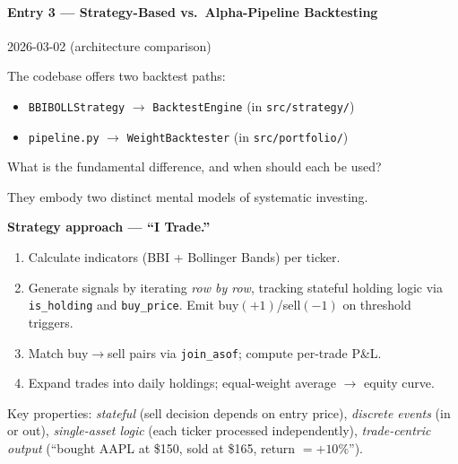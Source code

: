 \documentclass[a4paper, 11pt]{report}
\theoremstyle{definition}
\theoremstyle{remark}
\begin{document}
\paragraph{Entry 3 --- Strategy-Based vs.\ Alpha-Pipeline Backtesting}
\label{exp:strategy-vs-pipeline}
\begin{description}[style=nextline, leftmargin=1.8cm]
    \item[Date] 2026-03-02 \quad (architecture comparison)
    \item[Question]
        The codebase offers two backtest paths:
        \begin{itemize}[nosep,topsep=2pt]
            \item \texttt{BBIBOLLStrategy} $\to$
                  \texttt{BacktestEngine}
                  (in \texttt{src/strategy/})
            \item \texttt{pipeline.py} $\to$
                  \texttt{WeightBacktester}
                  (in \texttt{src/portfolio/})
        \end{itemize}
        What is the fundamental difference, and when should
        each be used?

    \item[Finding]
        They embody two distinct mental models of systematic investing.

        \medskip
        \textbf{Strategy approach --- ``I Trade.''}
        \begin{enumerate}[nosep]
            \item Calculate indicators (BBI + Bollinger Bands) per ticker.
            \item Generate signals by iterating \emph{row by row},
                  tracking stateful holding logic via
                  \texttt{is\_holding} and \texttt{buy\_price}.
                  Emit buy$(+1)$/sell$(-1)$ on threshold triggers.
            \item Match buy$\to$sell pairs via \texttt{join\_asof};
                  compute per-trade P\&L.
            \item Expand trades into daily holdings; equal-weight
                  average $\to$ equity curve.
        \end{enumerate}
        Key properties: \emph{stateful} (sell decision depends on entry
        price), \emph{discrete events} (in or out), \emph{single-asset
        logic} (each ticker processed independently),
        \emph{trade-centric output} (``bought AAPL at \$150,
        sold at \$165, return $= +10\%$'').


\end{description}
\end{document}
